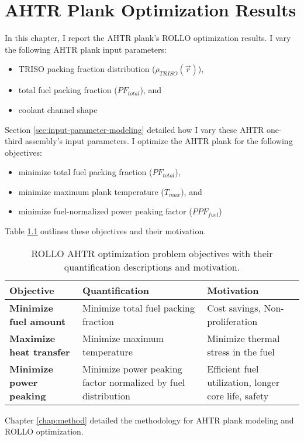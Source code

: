 \chapter{AHTR Plank Optimization Results}
\glsresetall
\label{chap:ahtr-plank-opt-results}
In this chapter, I report the \gls{AHTR} plank's \gls{ROLLO} optimization results. 
I vary the following \gls{AHTR} plank input parameters:
\begin{itemize}
    \item \gls{TRISO} packing fraction distribution ($\rho_{TRISO}(\vec{r})$),
    \item total fuel packing fraction ($PF_{total}$), and 
    \item coolant channel shape
\end{itemize} 
Section \ref{sec:input-parameter-modeling} detailed how I vary these 
\gls{AHTR} one-third assembly's input parameters. 
I optimize the \gls{AHTR} plank for the following objectives:
\begin{itemize}
    \item minimize total fuel packing fraction ($PF_{total}$), 
    \item minimize maximum plank temperature ($T_{max}$), and
    \item minimize fuel-normalized power peaking factor ($PPF_{fuel}$)
\end{itemize} 
Table \ref{tab:objectives-2} outlines these objectives and their motivation.
\begin{table}[htbp]
    \centering
    \onehalfspacing
    \caption{\acrfull{ROLLO} \acrfull{AHTR} optimization problem objectives with 
    their quantification descriptions and motivation.}
	\label{tab:objectives-2}
    \footnotesize
    \begin{tabular}{p{4.5cm}|p{5cm}p{5cm}}
    \hline 
    \textbf{Objective}& \textbf{Quantification}& \textbf{Motivation} \\
    \hline
    \textbf{Minimize fuel amount} & Minimize total fuel packing \newline fraction 
    & Cost savings, Non-proliferation \\ 
    \hline
    \textbf{Maximize heat transfer} & Minimize maximum temperature 
    & Minimize thermal stress in the fuel \\
    \hline
    \textbf{Minimize power peaking} & Minimize power peaking factor normalized by fuel distribution 
    & Efficient fuel utilization, longer core life, safety\\
    \hline
    \end{tabular}
\end{table}
Chapter \ref{chap:method} detailed the methodology for \gls{AHTR} plank modeling 
and \gls{ROLLO} optimization. 

